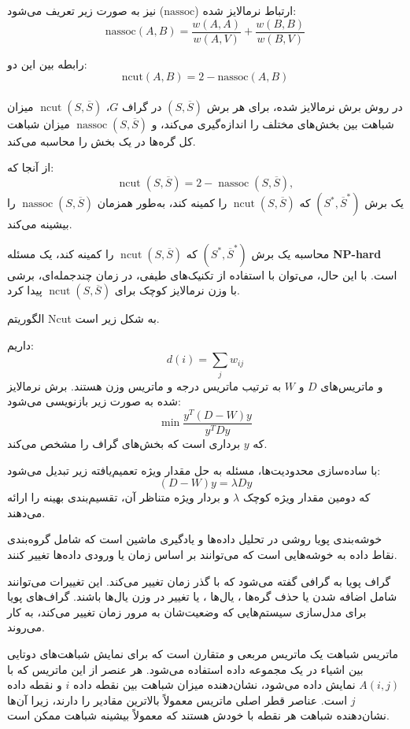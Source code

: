 \documentclass[a4paper,12pt,openany]{report}
\begin{document}
\begin{description}
		ارتباط نرمالایز شده (\( \text{nassoc} \)) نیز به صورت زیر تعریف می‌شود:
		\[
		\text{nassoc}(A, B) = \frac{w(A, A)}{w(A, V)} + \frac{w(B, B)}{w(B, V)}
		\]
		
		رابطه بین این دو:
		\[
		\text{ncut}(A, B) = 2 - \text{nassoc}(A, B)
		\]
		\\
		
		در روش برش نرمالایز شده، برای هر برش \( (S, \overline{S}) \) در گراف \( G \)، \( \operatorname{ncut}(S, \overline{S}) \) میزان شباهت بین بخش‌های مختلف را اندازه‌گیری می‌کند، و \( \operatorname{nassoc}(S, \overline{S}) \) میزان شباهت کل گره‌ها در یک بخش را محاسبه می‌کند.
		
		از آنجا که:
		\[
		\operatorname{ncut}(S, \overline{S}) = 2 - \operatorname{nassoc}(S, \overline{S}),
		\]
		یک برش \( (S^*, \overline{S}^*) \) که \( \operatorname{ncut}(S, \overline{S}) \) را کمینه کند، به‌طور همزمان \( \operatorname{nassoc}(S, \overline{S}) \) را بیشینه می‌کند.
		
		محاسبه یک برش \( (S^*, \overline{S}^*) \) که \( \operatorname{ncut}(S, \overline{S}) \) را کمینه کند، یک مسئله \textbf{NP-hard} است. با این حال، می‌توان با استفاده از تکنیک‌های طیفی، در زمان چندجمله‌ای، برشی با وزن نرمالایز کوچک برای \( \operatorname{ncut}(S, \overline{S}) \) پیدا کرد.
		
		الگوریتم Ncut به شکل زیر است.
		
		 داریم:
		\[
		d(i) = \sum_j w_{ij}
		\]
		و ماتریس‌های \( D \) و \( W \) به ترتیب ماتریس درجه و ماتریس وزن هستند. برش نرمالایز شده به صورت زیر بازنویسی می‌شود:
		\[
		\min \frac{y^T (D - W) y}{y^T D y}
		\]
		که \( y \) برداری است که بخش‌های گراف را مشخص می‌کند. 
		
		با ساده‌سازی محدودیت‌ها، مسئله به حل مقدار ویژه تعمیم‌یافته زیر تبدیل می‌شود:
		\[
		(D - W) y = \lambda D y
		\]
		که دومین مقدار ویژه کوچک \( \lambda \) و بردار ویژه متناظر آن، تقسیم‌بندی بهینه را ارائه می‌دهند.
		
		\item[\textbullet\ خوشه بندی پویا:] خوشه‌بندی پویا  روشی در تحلیل داده‌ها و یادگیری ماشین است که شامل گروه‌بندی نقاط داده به خوشه‌هایی است که می‌توانند بر اساس زمان یا ورودی داده‌ها تغییر کنند.
		
		\item[\textbullet\ گراف پویا:] گراف پویا  به گرافی گفته می‌شود که با گذر زمان تغییر می‌کند. این تغییرات می‌توانند شامل اضافه شدن یا حذف گره‌ها ، یال‌ها ، یا تغییر در وزن یال‌ها باشند. گراف‌های پویا برای مدل‌سازی سیستم‌هایی که وضعیت‌شان به مرور زمان تغییر می‌کند، به کار می‌روند.
		\item[\textbullet\ ماتریس شباهت:] 
		ماتریس شباهت  یک ماتریس مربعی و متقارن است که برای نمایش شباهت‌های دوتایی بین اشیاء در یک مجموعه داده استفاده می‌شود. هر عنصر از این ماتریس که با \( A(i, j) \) نمایش داده می‌شود، نشان‌دهنده میزان شباهت بین نقطه داده \( i \) و نقطه داده \( j \) است. عناصر قطر اصلی ماتریس معمولاً بالاترین مقادیر را دارند، زیرا آن‌ها نشان‌دهنده شباهت هر نقطه با خودش هستند که معمولاً بیشینه شباهت ممکن است.
		

\end{description}
\end{document}
